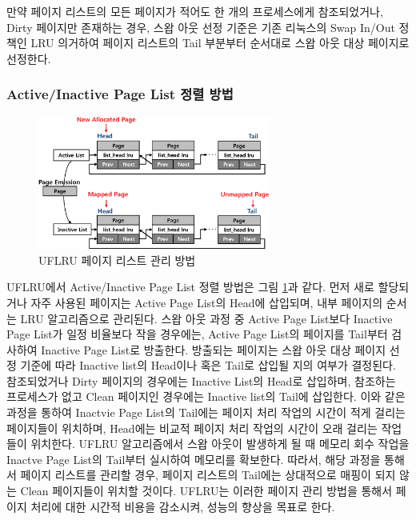 \documentclass[letterpaper,twocolumn,10pt]{article}
\begin{document}
만약 페이지 리스트의 모든 페이지가 적어도 한 개의 프로세스에게 참조되었거나, Dirty 페이지만 존재하는 경우, 스왑 아웃 선정 기준은 기존 리눅스의 Swap In/Out 정책인 LRU 의거하여 페이지 리스트의 Tail 부분부터 순서대로 스왑 아웃 대상 페이지로 선정한다.  

\subsubsection{Active/Inactive Page List 정렬 방법}

\begin{figure}[t]
\begin{center}
\includegraphics[width=3in]{./figure/uflru_list.eps}
\caption{UFLRU 페이지 리스트 관리 방법}
\label{fig:uflru_list}
\end{center}
\end{figure}

UFLRU에서 Active/Inactive Page List 정렬 방법은 그림 \ref{fig:uflru_list}과 같다. 먼저 새로 할당되거나 자주 사용된 페이지는 Active Page List의 Head에 삽입되며, 내부 페이지의 순서는 LRU 알고리즘으로 관리된다. 스왑 아웃 과정 중 Active Page List보다 Inactive Page List가 일정 비율보다 작을 경우에는, Active Page List의 페이지를 Tail부터 검사하여 Inactive Page List로 방출한다. 방출되는 페이지는 스왑 아웃 대상 페이지 선정 기준에 따라 Inactive list의 Head이나 혹은 Tail로 삽입될 지의 여부가 결정된다. 참조되었거나 Dirty 페이지의 경우에는 Inactive List의 Head로 삽입하며, 참조하는 프로세스가 없고 Clean 페이지인 경우에는 Inactive list의 Tail에 삽입한다. 이와 같은 과정을 통하여 Inactvie Page List의 Tail에는 페이지 처리 작업의 시간이 적게 걸리는 페이지들이 위치하며, Head에는 비교적 페이지 처리 작업의 시간이 오래 걸리는 작업들이 위치한다. UFLRU 알고리즘에서 스왑 아웃이 발생하게 될 때 메모리 회수 작업을 Inactve Page List의 Tail부터 실시하여 메모리를 확보한다. 따라서, 해당 과정을 통해서 페이지 리스트를 관리할 경우, 페이지 리스트의 Tail에는 상대적으로 매핑이 되지 않는 Clean 페이지들이 위치할 것이다. UFLRU는 이러한 페이지 관리 방법을 통해서 페이지 처리에 대한 시간적 비용을 감소시켜, 성능의 향상을 목표로 한다.
\end{document}
